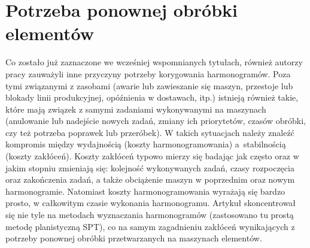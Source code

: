 \documentclass[printmode,oneside]{mgr}
\begin{document}
\section{Potrzeba ponownej obróbki elementów}
Co zostało już zaznaczone we wcześniej wspomnianych tytułach, również autorzy pracy \cite{IPMRWJRD} zauważyli inne przyczyny potrzeby korygowania harmonogramów. Poza tymi związanymi z zasobami (awarie lub zawieszanie się maszyn, przestoje lub blokady linii produkcyjnej, opóźnienia w dostawach, itp.) istnieją również takie, które mają związek z samymi zadaniami wykonywanymi na maszynach (anulowanie lub nadejście nowych zadań, zmiany ich priorytetów, czasów obróbki, czy też potrzeba poprawek lub przeróbek). W takich sytuacjach należy znaleźć kompromis między wydajnością (koszty harmonogramowania) a~stabilnością (koszty zakłóceń). Koszty zakłóceń typowo mierzy się badając jak często oraz w jakim stopniu zmieniają się: kolejność wykonywanych zadań, czasy rozpoczęcia oraz zakończenia zadań, a także obciążenie maszyn w poprzednim oraz nowym harmonogramie. Natomiast koszty  harmonogramowania wyrażają się bardzo prosto, w całkowitym czasie wykonania harmonogramu. Artykuł skoncentrował się nie tyle na metodach wyznaczania harmonogramów (zastosowano tu prostą metodę planistyczną SPT), co na samym zagadnieniu zakłóceń wynikających z potrzeby ponownej obróbki przetwarzanych na maszynach elementów.
%
\end{document}
